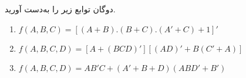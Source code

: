دوگان توابع زیر را به‌دست آورید.


\begin{latin}
	\begin{enumerate}
		\item 
		$f(A,B,C) = [(A+B).(B+C).(A'+C)+1]'$
		
		\item 
		$f(A,B,C,D) = [A + (BCD)'][ (AD)' + B(C' + A) ]$
		
		\item 
		$f(A,B,C,D) = AB'C + (A' + B + D)(ABD' + B')$
	\end{enumerate}
\end{latin}